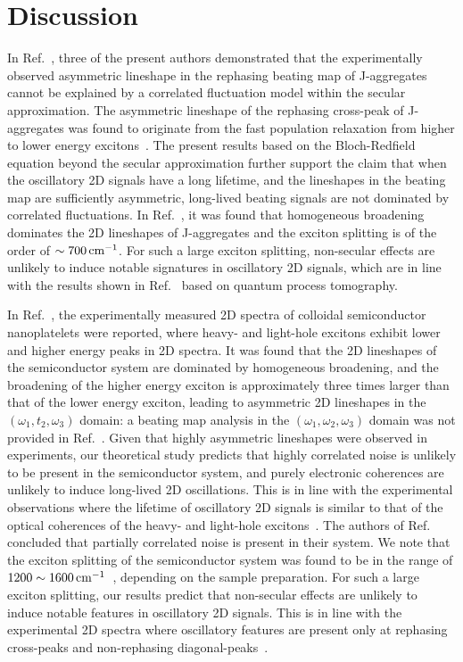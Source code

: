 \documentclass[%
 reprint,%
 amssymb, amsmath,%
 aip,cha,%
]{revtex4-1}
\begin{document}
\section{Discussion}

In Ref.~, three of the present authors demonstrated that the experimentally observed asymmetric lineshape in the rephasing beating map of J-aggregates cannot be explained by a correlated fluctuation model within the secular approximation. The asymmetric lineshape of the rephasing cross-peak of J-aggregates was found to originate from the fast population relaxation from higher to lower energy excitons~\cite{LimNC2015}. The present results based on the Bloch-Redfield equation beyond the secular approximation further support the claim that when the oscillatory 2D signals have a long lifetime, and the lineshapes in the beating map are sufficiently asymmetric, long-lived beating signals are not dominated by correlated fluctuations. In Ref.~, it was found that homogeneous broadening dominates the 2D lineshapes of J-aggregates and the exciton splitting is of the order of $\sim 700\,{\rm cm}^{-1}$. For such a large exciton splitting, non-secular effects are unlikely to induce notable signatures in oscillatory 2D signals, which are in line with the results shown in Ref.~ based on quantum process tomography.

In Ref.~, the experimentally measured 2D spectra of colloidal semiconductor nanoplatelets were reported, where heavy- and light-hole excitons exhibit lower and higher energy peaks in 2D spectra. It was found that the 2D lineshapes of the semiconductor system are dominated by homogeneous broadening, and the broadening of the higher energy exciton is approximately three times larger than that of the lower energy exciton, leading to asymmetric 2D lineshapes in the $(\omega_1,t_2,\omega_3)$ domain: a beating map analysis in the $(\omega_1,\omega_2,\omega_3)$ domain was not provided in Ref.~. Given that highly asymmetric lineshapes were observed in experiments, our theoretical study predicts that highly correlated noise is unlikely to be present in the semiconductor system, and purely electronic coherences are unlikely to induce long-lived 2D oscillations. This is in line with the experimental observations where the lifetime of oscillatory 2D signals is similar to that of the optical coherences of the heavy- and light-hole excitons~\cite{CassetteNC2015}. The authors of Ref.~ concluded that partially correlated noise is present in their system. We note that the exciton splitting of the semiconductor system was found to be in the range of $1200\sim1600\,{\rm cm}^{-1}$~\cite{CassetteNC2015}, depending on the sample preparation. For such a large exciton splitting, our results predict that non-secular effects are unlikely to induce notable features in oscillatory 2D signals. This is in line with the experimental 2D spectra where oscillatory features are present only at rephasing cross-peaks and non-rephasing diagonal-peaks~\cite{CassetteNC2015}.
\end{document}
